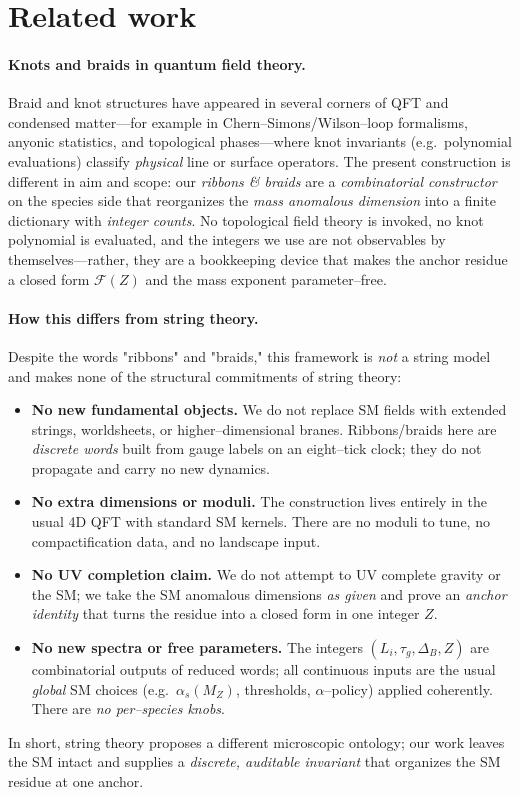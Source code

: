 \documentclass[epjc3]{svjour3}
\begin{document}
\section{Related work}

\paragraph{Knots and braids in quantum field theory.}
Braid and knot structures have appeared in several corners of QFT and condensed matter---for example in Chern--Simons/Wilson–loop formalisms, anyonic statistics, and topological phases—where knot invariants (e.g.\ polynomial evaluations) classify \emph{physical} line or surface operators.  The present construction is different in aim and scope: our \emph{ribbons \& braids} are a \emph{combinatorial constructor} on the species side that reorganizes the \emph{mass anomalous dimension} into a finite dictionary with \emph{integer counts}.  No topological field theory is invoked, no knot polynomial is evaluated, and the integers we use are not observables by themselves—rather, they are a bookkeeping device that makes the anchor residue a closed form $\mathcal F(Z)$ and the mass exponent parameter--free.

\paragraph{How this differs from string theory.}
Despite the words "ribbons" and "braids," this framework is \emph{not} a string model and makes none of the structural commitments of string theory:
\begin{itemize}
  \item \textbf{No new fundamental objects.}  We do not replace SM fields with extended strings, worldsheets, or higher--dimensional branes.  Ribbons/braids here are \emph{discrete words} built from gauge labels on an eight--tick clock; they do not propagate and carry no new dynamics.
  \item \textbf{No extra dimensions or moduli.}  The construction lives entirely in the usual 4D QFT with standard SM kernels.  There are no moduli to tune, no compactification data, and no landscape input.
  \item \textbf{No UV completion claim.}  We do not attempt to UV complete gravity or the SM; we take the SM anomalous dimensions \emph{as given} and prove an \emph{anchor identity} that turns the residue into a closed form in one integer $Z$.
  \item \textbf{No new spectra or free parameters.}  The integers $(L_i,\tau_g,\Delta_B,Z)$ are combinatorial outputs of reduced words; all continuous inputs are the usual \emph{global} SM choices (e.g.\ $\alpha_s(M_Z)$, thresholds, $\alpha$--policy) applied coherently.  There are \emph{no per--species knobs}.
\end{itemize}
In short, string theory proposes a different microscopic ontology; our work leaves the SM intact and supplies a \emph{discrete, auditable invariant} that organizes the SM residue at one anchor.
\end{document}
